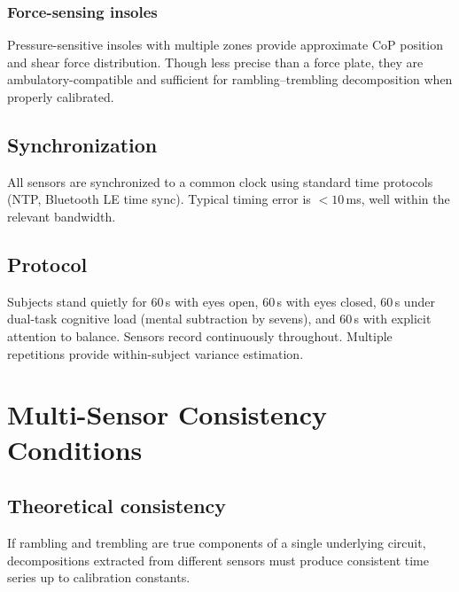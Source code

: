 \documentclass[11pt,twocolumn,a4paper]{article}
\theoremstyle{definition}
\theoremstyle{remark}
\begin{document}
\subsubsection{Force-sensing insoles}

Pressure-sensitive insoles with multiple zones provide
approximate CoP position and shear force distribution. Though
less precise than a force plate, they are ambulatory-compatible
and sufficient for rambling--trembling decomposition when properly
calibrated.

\subsection{Synchronization}

All sensors are synchronized to a common clock using standard
time protocols (NTP, Bluetooth LE time sync). Typical timing
error is $<10$\,ms, well within the relevant bandwidth.

\subsection{Protocol}

Subjects stand quietly for $60$\,s with eyes open, $60$\,s with
eyes closed, $60$\,s under dual-task cognitive load (mental
subtraction by sevens), and $60$\,s with explicit attention to
balance. Sensors record continuously throughout. Multiple
repetitions provide within-subject variance estimation.


\section{Multi-Sensor Consistency Conditions}
\label{sec:consistency}

\subsection{Theoretical consistency}

If rambling and trembling are true components of a single
underlying circuit, decompositions extracted from different
sensors must produce consistent time series up to calibration
constants.
\end{document}
